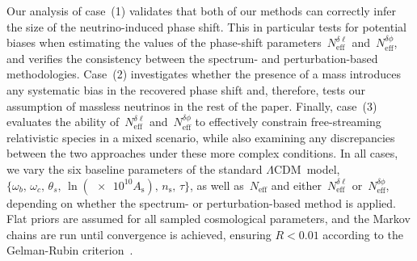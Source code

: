 \documentclass[11pt]{article}
\numberwithin{equation}{section}
\newcommand{\As}{A_\mathrm{s}}
\newcommand{\ns}{n_\mathrm{s}}
\newcommand{\Neff}{N_\mathrm{eff}}
\newcommand{\Nphase}{N_\mathrm{eff}^{\delta\phi}}
\newcommand{\Nmultipole}{N_\mathrm{eff}^{\delta\ell}}
\begin{document}
Our analysis of case~(1) validates that both of our methods can correctly infer the size of the neutrino-induced phase shift. This in particular tests for potential biases when estimating the values of the phase-shift parameters~$\Nmultipole$ and~$\Nphase$, and verifies the consistency between the spectrum- and perturbation-based methodologies. Case~(2) investigates whether the presence of a mass introduces any systematic bias in the recovered phase shift and, therefore, tests our assumption of massless neutrinos in the rest of the paper. Finally, case~(3) evaluates the ability of~$\Nmultipole$ and~$\Nphase$ to effectively constrain free-streaming relativistic species in a mixed scenario, while also examining any discrepancies between the two approaches under these more complex conditions. In all cases, we vary the six baseline parameters of the standard $\Lambda$CDM~model, $\{\omega_b,\,\omega_c,\,\theta_s,\,\ln(\num{e10}\As),\,\ns,\,\tau\}$, as well as~$\Neff$ and either~$\Nmultipole$ or~$\Nphase$, depending on whether the spectrum- or perturbation-based method is applied. Flat priors are assumed for all sampled cosmological parameters, and the Markov chains are run until convergence is achieved, ensuring $R < 0.01$ according to the Gelman-Rubin criterion~\cite{Gelman:1992zz}.\medskip
\end{document}
